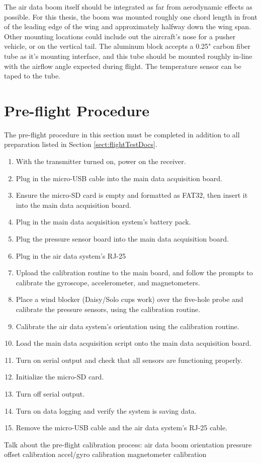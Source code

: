 The air data boom itself should be integrated as far from aerodynamic effects as possible. For this thesis, the boom was mounted roughly one chord length in front of the leading edge of the wing and approximately halfway down the wing span. Other mounting locations could include out the aircraft's nose for a pusher vehicle, or on the vertical tail. The aluminum block accepts a 0.25" carbon fiber tube as it's mounting interface, and this tube should be mounted roughly in-line with the airflow angle expected during flight. The temperature sensor can be taped to the tube.

\section{Pre-flight Procedure}
\label{sect:preFlightProc}
The pre-flight procedure in this section must be completed in addition to all preparation listed in Section \ref{sect:flightTestDocs}.

\begin{enumerate}
\item With the transmitter turned on, power on the receiver.
\item Plug in the micro-USB cable into the main data acquisition board.
\item Ensure the micro-SD card is empty and formatted as FAT32, then insert it into the main data acquisition board.
\item Plug in the main data acquisition system's battery pack.
\item Plug the pressure sensor board into the main data acquisition board.
\item Plug in the air data system's RJ-25
\item Upload the calibration routine to the main board, and follow the prompts to calibrate the gyroscope, accelerometer, and magnetometers.
\item Place a wind blocker (Daisy/Solo cups work) over the five-hole probe and calibrate the pressure sensors, using the calibration routine.
\item Calibrate the air data system's orientation using the calibration routine.
\item Load the main data acquisition script onto the main data acquisition board.
\item Turn on serial output and check that all sensors are functioning properly.
\item Initialize the micro-SD card.
\item Turn off serial output.
\item Turn on data logging and verify the system is saving data.
\item Remove the micro-USB cable and the air data system's RJ-25 cable.
\end{enumerate}
Talk about the pre-flight calibration process:
air data boom orientation
pressure offset calibration
accel/gyro calibration
magnetometer calibration


